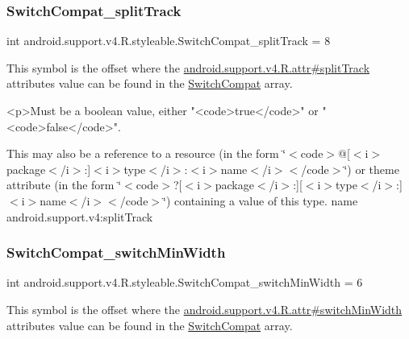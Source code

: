 \subsubsection{\texorpdfstring{Switch\+Compat\+\_\+split\+Track}{SwitchCompat\_splitTrack}}
{\footnotesize\ttfamily int android.\+support.\+v4.\+R.\+styleable.\+Switch\+Compat\+\_\+split\+Track = 8\hspace{0.3cm}{\ttfamily [static]}}

This symbol is the offset where the \hyperlink{classandroid_1_1support_1_1v4_1_1R_1_1attr_ac4a39d568e4a2e6074984c53e7769d38}{android.\+support.\+v4.\+R.\+attr\#split\+Track} attribute\textquotesingle{}s value can be found in the \hyperlink{classandroid_1_1support_1_1v4_1_1R_1_1styleable_a3b46a9ea84acdcc1d9e88a54fc6f685e}{Switch\+Compat} array.

\begin{DoxyVerb}      <p>Must be a boolean value, either "<code>true</code>" or "<code>false</code>".
\end{DoxyVerb}
 

This may also be a reference to a resource (in the form \char`\"{}$<$code$>$@\mbox{[}$<$i$>$package$<$/i$>$\+:\mbox{]}$<$i$>$type$<$/i$>$\+:$<$i$>$name$<$/i$>$$<$/code$>$\char`\"{}) or theme attribute (in the form \char`\"{}$<$code$>$?\mbox{[}$<$i$>$package$<$/i$>$\+:\mbox{]}\mbox{[}$<$i$>$type$<$/i$>$\+:\mbox{]}$<$i$>$name$<$/i$>$$<$/code$>$\char`\"{}) containing a value of this type.  name android.\+support.\+v4\+:split\+Track \mbox{\label{classandroid_1_1support_1_1v4_1_1R_1_1styleable_a1b72b7cb596d02dd5a8d98490dbe1a50}} 
\subsubsection{\texorpdfstring{Switch\+Compat\+\_\+switch\+Min\+Width}{SwitchCompat\_switchMinWidth}}
{\footnotesize\ttfamily int android.\+support.\+v4.\+R.\+styleable.\+Switch\+Compat\+\_\+switch\+Min\+Width = 6\hspace{0.3cm}{\ttfamily [static]}}

This symbol is the offset where the \hyperlink{classandroid_1_1support_1_1v4_1_1R_1_1attr_a7c019492c8733534606bb32dc3cc6df5}{android.\+support.\+v4.\+R.\+attr\#switch\+Min\+Width} attribute\textquotesingle{}s value can be found in the \hyperlink{classandroid_1_1support_1_1v4_1_1R_1_1styleable_a3b46a9ea84acdcc1d9e88a54fc6f685e}{Switch\+Compat} array.

